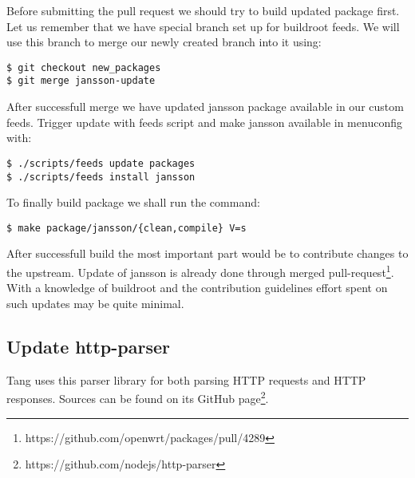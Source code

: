 Before submitting the pull request we should try to build updated package first.
Let us remember that we have special branch set up for buildroot feeds.
We will use this branch to merge our newly created branch into it using:
\begin{lstlisting}[columns=fixed,basicstyle=\ttfamily\footnotesize,tabsize=4,backgroundcolor=\color{yellow!10}]
$ git checkout new_packages
$ git merge jansson-update
\end{lstlisting}
After successfull merge we have updated jansson package available in our custom feeds.
Trigger update with feeds script and make jansson available in menuconfig with:
\begin{lstlisting}[columns=fixed,basicstyle=\ttfamily\footnotesize,tabsize=4,backgroundcolor=\color{yellow!10}]
$ ./scripts/feeds update packages
$ ./scripts/feeds install jansson
\end{lstlisting}
To finally build package we shall run the command:
\begin{lstlisting}[columns=fixed,basicstyle=\ttfamily\footnotesize,tabsize=4,backgroundcolor=\color{yellow!10}]
$ make package/jansson/{clean,compile} V=s
\end{lstlisting}

After successfull build the most important part would be to contribute changes to the upstream.
Update of jansson is already done through merged pull-request\footnote{https://github.com/openwrt/packages/pull/4289}.
With a knowledge of buildroot and the contribution guidelines effort spent on such updates may be quite minimal.



\subsection{Update http-parser}\label{http-parser}
Tang uses this parser library for both parsing HTTP requests and HTTP responses.
Sources can be found on its GitHub page\footnote{https://github.com/nodejs/http-parser}.

